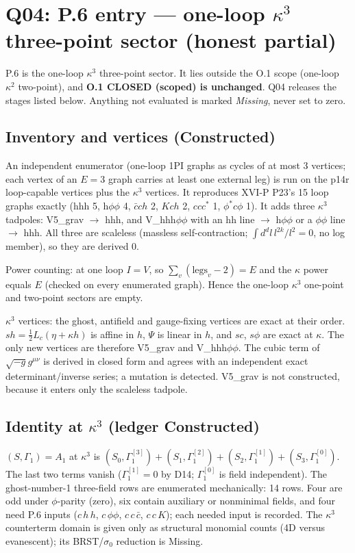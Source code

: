 \section{Q04: P.6 entry --- one-loop $\kappa^3$ three-point sector (honest partial)}
P.6 is the one-loop $\kappa^3$ three-point sector. It lies outside the O.1 scope (one-loop $\kappa^2$ two-point), and
\textbf{O.1 CLOSED (scoped) is unchanged}. Q04 releases the stages listed below. Anything not evaluated is marked
\emph{Missing}, never set to zero.

\subsection{Inventory and vertices (Constructed)}
An independent enumerator (one-loop 1PI graphs as cycles of at most 3 vertices; each vertex of an $E=3$ graph carries at
least one external leg) is run on the p14r loop-capable vertices plus the $\kappa^3$ vertices. It reproduces XVI-P P23's
15 loop graphs exactly (hhh 5, h$\phi\phi$ 4, $\bar c c h$ 2, $Kch$ 2, $c c c^*$ 1, $\phi^* c\phi$ 1). It adds three
$\kappa^3$ tadpoles: V5\_grav $\to$ hhh, and V\_hhh$\phi\phi$ with an hh line $\to$ h$\phi\phi$ or a $\phi\phi$ line
$\to$ hhh. All three are scaleless (massless self-contraction; $\int d^dl\, l^{2k}/l^2=0$, no log member), so they
are derived 0.

Power counting: at one loop $I=V$, so $\sum_v(\mathrm{legs}_v-2)=E$ and the $\kappa$ power equals $E$ (checked on every
enumerated graph). Hence the one-loop $\kappa^3$ one-point and two-point sectors are empty.

$\kappa^3$ vertices: the ghost, antifield and gauge-fixing vertices are exact at their order. $s h=\tfrac12 L_c(\eta+\kappa h)$
is affine in $h$, $\Psi$ is linear in $h$, and $s c$, $s\phi$ are exact at $\kappa$. The only new vertices are therefore
V5\_grav and V\_hhh$\phi\phi$. The cubic term of $\sqrt{-g}g^{\mu\nu}$ is derived in closed form and agrees with an
independent exact determinant/inverse series; a mutation is detected. V5\_grav is not constructed, because it enters only
the scaleless tadpole.

\subsection{Identity at $\kappa^3$ (ledger Constructed)}
$(S,\Gamma_1)=A_1$ at $\kappa^3$ is $(S_0,\Gamma_1^{[3]})+(S_1,\Gamma_1^{[2]})+(S_2,\Gamma_1^{[1]})+(S_3,\Gamma_1^{[0]})$.
The last two terms vanish ($\Gamma_1^{[1]}=0$ by D14; $\Gamma_1^{[0]}$ is field independent). The ghost-number-1 three-field
rows are enumerated mechanically: 14 rows. Four are odd under $\phi$-parity (zero), six contain auxiliary or nonminimal
fields, and four need P.6 inputs ($c\,h\,h$, $c\,\phi\phi$, $c\,c\,\bar c$, $c\,c\,K$); each needed input is recorded. The
$\kappa^3$ counterterm domain is given only as structural monomial counts (4D versus evanescent); its BRST/$\sigma_0$
reduction is Missing.

